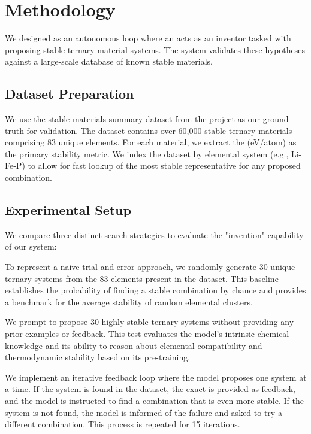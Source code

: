 \section{Methodology}
\label{sec:method}

We designed \ours as an autonomous loop where an \llm acts as an inventor tasked with proposing stable ternary material systems. The system validates these hypotheses against a large-scale database of known stable materials.

\subsection{Dataset Preparation}
We use the stable materials summary dataset from the \gnome project \cite{merchant2023scaling} as our ground truth for validation. The dataset contains over 60,000 stable ternary materials comprising 83 unique elements. For each material, we extract the \efeas (eV/atom) as the primary stability metric. We index the dataset by elemental system (e.g., Li-Fe-P) to allow for fast lookup of the most stable representative for any proposed combination.

\subsection{Experimental Setup}
We compare three distinct search strategies to evaluate the "invention" capability of our system:

To represent a naive trial-and-error approach, we randomly generate 30 unique ternary systems from the 83 elements present in the dataset. This baseline establishes the probability of finding a stable combination by chance and provides a benchmark for the average stability of random elemental clusters.

We prompt \gpt to propose 30 highly stable ternary systems without providing any prior examples or feedback. This test evaluates the model's intrinsic chemical knowledge and its ability to reason about elemental compatibility and thermodynamic stability based on its pre-training.

We implement an iterative feedback loop where the model proposes one system at a time. If the system is found in the \gnome dataset, the exact \efeas is provided as feedback, and the model is instructed to find a combination that is even more stable. If the system is not found, the model is informed of the failure and asked to try a different combination. This process is repeated for 15 iterations.


